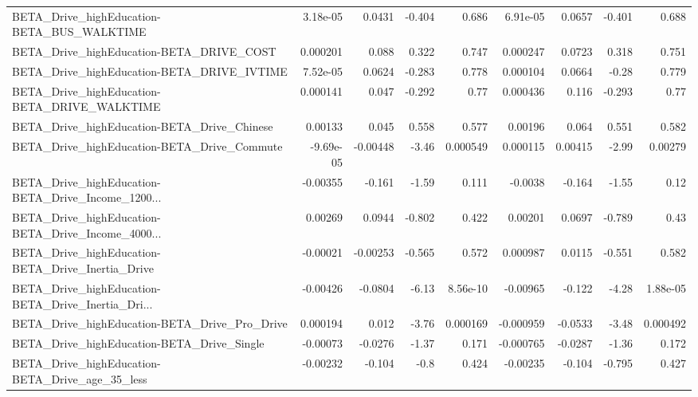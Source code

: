 \begin{tabular}{lrrrrrrrr}
BETA\_Drive\_highEducation-BETA\_BUS\_WALKTIME         &    3.18e-05 &       0.0431 &   -0.404 &    0.686 &   6.91e-05 &      0.0657 &       -0.401 &         0.688 \\
BETA\_Drive\_highEducation-BETA\_DRIVE\_COST           &    0.000201 &        0.088 &    0.322 &    0.747 &   0.000247 &      0.0723 &        0.318 &         0.751 \\
BETA\_Drive\_highEducation-BETA\_DRIVE\_IVTIME         &    7.52e-05 &       0.0624 &   -0.283 &    0.778 &   0.000104 &      0.0664 &        -0.28 &         0.779 \\
BETA\_Drive\_highEducation-BETA\_DRIVE\_WALKTIME       &    0.000141 &        0.047 &   -0.292 &     0.77 &   0.000436 &       0.116 &       -0.293 &          0.77 \\
BETA\_Drive\_highEducation-BETA\_Drive\_Chinese        &     0.00133 &        0.045 &    0.558 &    0.577 &    0.00196 &       0.064 &        0.551 &         0.582 \\
BETA\_Drive\_highEducation-BETA\_Drive\_Commute        &   -9.69e-05 &     -0.00448 &    -3.46 & 0.000549 &   0.000115 &     0.00415 &        -2.99 &       0.00279 \\
BETA\_Drive\_highEducation-BETA\_Drive\_Income\_1200... &    -0.00355 &       -0.161 &    -1.59 &    0.111 &    -0.0038 &      -0.164 &        -1.55 &          0.12 \\
BETA\_Drive\_highEducation-BETA\_Drive\_Income\_4000... &     0.00269 &       0.0944 &   -0.802 &    0.422 &    0.00201 &      0.0697 &       -0.789 &          0.43 \\
BETA\_Drive\_highEducation-BETA\_Drive\_Inertia\_Drive  &    -0.00021 &     -0.00253 &   -0.565 &    0.572 &   0.000987 &      0.0115 &       -0.551 &         0.582 \\
BETA\_Drive\_highEducation-BETA\_Drive\_Inertia\_Dri... &    -0.00426 &      -0.0804 &    -6.13 & 8.56e-10 &   -0.00965 &      -0.122 &        -4.28 &      1.88e-05 \\
BETA\_Drive\_highEducation-BETA\_Drive\_Pro\_Drive      &    0.000194 &        0.012 &    -3.76 & 0.000169 &  -0.000959 &     -0.0533 &        -3.48 &      0.000492 \\
BETA\_Drive\_highEducation-BETA\_Drive\_Single         &    -0.00073 &      -0.0276 &    -1.37 &    0.171 &  -0.000765 &     -0.0287 &        -1.36 &         0.172 \\
BETA\_Drive\_highEducation-BETA\_Drive\_age\_35\_less    &    -0.00232 &       -0.104 &     -0.8 &    0.424 &   -0.00235 &      -0.104 &       -0.795 &         0.427 \\

\end{tabular}
